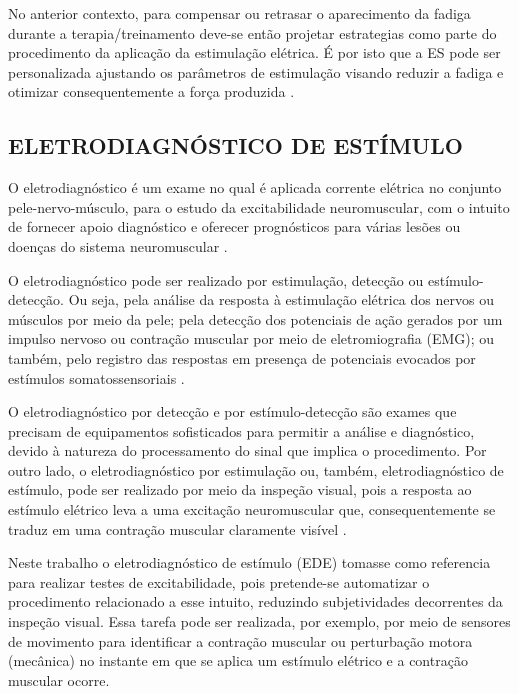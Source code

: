 No anterior contexto, para compensar ou retrasar o aparecimento da fadiga durante a terapia/treinamento deve-se então projetar estrategias como parte do procedimento da aplicação da estimulação elétrica. É por isto que a \acrshort{ES} pode ser personalizada ajustando os parâmetros de estimulação visando reduzir a fadiga e otimizar consequentemente a força produzida \cite{LamA.DoucetB.2012a}.




\subsection{ELETRODIAGNÓSTICO DE ESTÍMULO}

O eletrodiagnóstico é um exame no qual é aplicada corrente elétrica no conjunto pele-nervo-músculo, para o estudo da excitabilidade neuromuscular, com o intuito de fornecer apoio diagnóstico e oferecer prognósticos para várias lesões ou doenças do sistema neuromuscular \cite{Tejada1997}.

O eletrodiagnóstico pode ser realizado por estimulação, detecção ou estímulo-detecção. Ou seja, pela análise da resposta à estimulação elétrica dos nervos ou músculos por meio da pele; pela detecção dos potenciais de ação gerados por um impulso nervoso ou contração muscular por meio de eletromiografia (\acrshort{EMG}); ou também, pelo registro das respostas em presença de potenciais evocados por estímulos somatossensoriais \cite{Fernandes2016b, Paternostro-Sulga2002, Kimura2013}. 

O eletrodiagnóstico por detecção e por estímulo-detecção são exames que precisam de equipamentos sofisticados para permitir a análise e diagnóstico, devido à natureza do processamento do sinal que implica o procedimento. Por outro lado, o eletrodiagnóstico por estimulação ou, também, eletrodiagnóstico de estímulo, pode ser realizado por meio da inspeção visual, pois a resposta ao estímulo elétrico leva a uma excitação neuromuscular que, consequentemente se traduz em uma contração muscular claramente visível \cite{Naki2011, Fernandes2016b}. 

Neste trabalho o eletrodiagnóstico de estímulo (\acrshort{EDE}) tomasse como referencia para realizar testes de excitabilidade, pois pretende-se automatizar o procedimento relacionado a esse intuito, reduzindo subjetividades decorrentes da inspeção visual. Essa tarefa pode ser realizada, por exemplo, por meio de sensores de movimento para identificar a contração muscular ou perturbação motora (mecânica) no instante em que se aplica um estímulo elétrico e a contração muscular ocorre.

